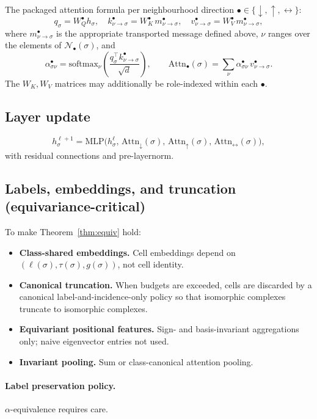 \documentclass[11pt]{article}
\theoremstyle{definition}
\theoremstyle{plain}
\newcommand{\Attn}{\mathrm{Attn}}
\newcommand{\MLP}{\mathrm{MLP}}
\newcommand{\softmax}{\mathrm{softmax}}
\begin{document}
The packaged attention formula per neighbourhood direction $\bullet \in \{\downarrow, \uparrow, \leftrightarrow\}$:
\[
q_\sigma = W_Q^{\bullet} h_\sigma,\quad k^{\bullet}_{\nu \to \sigma} = W_K^{\bullet} \, m^{\bullet}_{\nu \to \sigma},\quad v^{\bullet}_{\nu \to \sigma} = W_V^{\bullet}\, m^{\bullet}_{\nu \to \sigma},
\]
where $m^{\bullet}_{\nu \to \sigma}$ is the appropriate transported message defined above, $\nu$ ranges over the elements of $\mathcal{N}_{\bullet}(\sigma)$, and
\[
\alpha^{\bullet}_{\sigma\nu} = \softmax_\nu\!\left(\frac{q_\sigma^\top k^{\bullet}_{\nu \to \sigma}}{\sqrt{d}}\right),\qquad \Attn_{\bullet}(\sigma) = \sum_\nu \alpha^{\bullet}_{\sigma\nu}\, v^{\bullet}_{\nu \to \sigma}.
\]
The $W_K, W_V$ matrices may additionally be role-indexed within each $\bullet$.

\subsection{Layer update}

\[
h_\sigma^{\ell+1} = \MLP\bigl(h_\sigma^\ell,\, \Attn_{\downarrow}(\sigma),\, \Attn_{\uparrow}(\sigma),\, \Attn_{\leftrightarrow}(\sigma)\bigr),
\]
with residual connections and pre-layernorm.

\subsection{Labels, embeddings, and truncation (equivariance-critical)}\label{sec:labels}

To make Theorem~\ref{thm:equiv} hold:
\begin{itemize}
\item \textbf{Class-shared embeddings.} Cell embeddings depend on $(\ell(\sigma), \tau(\sigma), g(\sigma))$, not cell identity.
\item \textbf{Canonical truncation.} When budgets are exceeded, cells are discarded by a canonical label-and-incidence-only policy so that isomorphic complexes truncate to isomorphic complexes.
\item \textbf{Equivariant positional features.} Sign- and basis-invariant aggregations only; naive eigenvector entries not used.
\item \textbf{Invariant pooling.} Sum or class-canonical attention pooling.
\end{itemize}

\paragraph{Label preservation policy.} $\alpha$-equivalence requires care.
\end{document}
